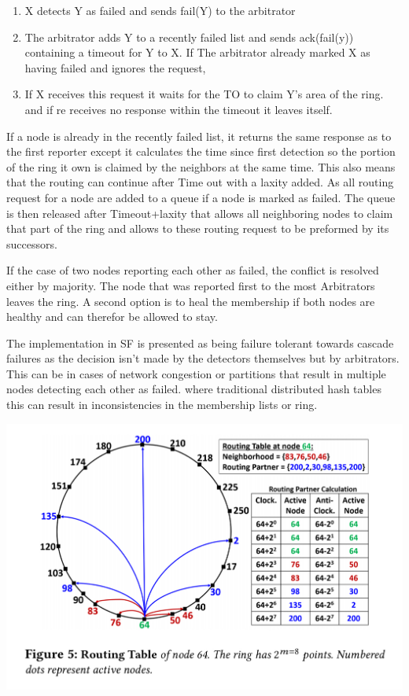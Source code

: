 \documentclass[a4paper,10pt,titlepage]{report}
\begin{document}
    \begin{enumerate}
        \item X detects Y as failed and sends fail(Y) to the arbitrator
        \item The arbitrator adds Y to a recently failed list and sends ack(fail(y)) containing a timeout for Y to X. If The arbitrator already marked X as having failed and ignores the request,
        \item If X receives this request it waits for the TO to claim Y's area of the ring. and if re receives no response within the timeout it leaves itself.
    \end{enumerate}

    If a node is already in the recently failed list, it returns the same response as to the first reporter except it calculates the time since first detection so the portion of the ring it own is claimed by the neighbors at the same time. This also means that the routing can continue after Time out with a laxity added. As all routing request for a node are added to a queue if a node is marked as failed. The queue is then released after Timeout+laxity that allows all neighboring nodes to claim that part of the ring and allows to these routing request to be preformed by its successors.\\
    \vspace{5mm}

    If the case of two nodes reporting each other as failed, the conflict is resolved either by majority. The node that was reported first to the most Arbitrators leaves the ring. A second option is to heal the membership if both nodes are healthy and can therefor be allowed to stay. \\   \vspace{5mm}
    
    The implementation in SF is presented as being failure tolerant towards cascade failures as the decision isn't made by the detectors themselves but by arbitrators.
    This can be in cases of network congestion or partitions that result in multiple nodes detecting each other as failed. where traditional distributed hash tables this can result in inconsistencies in the membership lists or ring.\\ 
    \vspace{5mm}

    \includegraphics[scale=0.3]{images/servicefabric-fig-ring-topology.jpeg}
\end{document}
